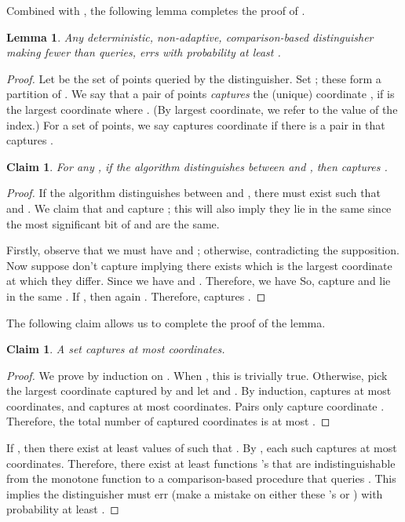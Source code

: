 \documentclass[11pt]{article}
\newtheorem{lemma}[theorem]{Lemma}
\newtheorem{claim}[theorem]{Claim}
\begin{document}
\noindent
Combined with , the following lemma completes the proof of .
\begin{lemma}\label{lem:hard}
Any deterministic, non-adaptive, comparison-based distinguisher  making fewer than  queries, errs with probability at least .
\end{lemma}
\begin{proof} 



Let  be the set of points queried by the distinguisher. Set ; these form a partition of .
We say that a pair of points  \emph{captures} the (unique) coordinate , if  is the largest
coordinate where . (By largest coordinate, we refer to the value of the index.)
For a set  of points, we say  captures coordinate  if there is a pair in  that captures .

\begin{claim}\label{clm:viol}
For any , if the algorithm distinguishes between  and , then  captures .
\end{claim}
\begin{proof} 
If the algorithm distinguishes between  and , there must exist  such that
  and . We claim that  and  capture ; this will also imply they lie in the same  since the  most significant bit of  and  are the same.



Firstly, observe that we must have  and ; otherwise,  contradicting the supposition. Now suppose  don't capture  implying there exists  which is the largest coordinate at which they differ. Since  we have  and . Therefore,
we have 
So,  capture  and lie in the same . If , then again . Therefore,  captures .
\end{proof}


\noindent
The following claim allows us to complete the proof of the lemma.
\begin{claim}\label{clm:cap} A set  captures at most  coordinates.
\end{claim}

\begin{proof} We prove by induction on . When , this is trivially true.
Otherwise, pick the largest coordinate  captured by  and let  and . 
By induction,  captures at most  coordinates, and  captures at most  coordinates.
Pairs  only capture coordinate . Therefore, the total number of captured coordinates is at most .
\end{proof}

\noindent

If , then there exist at least  values of 
such that . 
By , each such  captures at most  coordinates.
Therefore, there exist at least 
 functions 's that are indistinguishable from the monotone function  to a comparison-based procedure
that queries . 
This implies the distinguisher must err (make a mistake on either these 's or ) with probability at least .
\end{proof}
\end{document}
